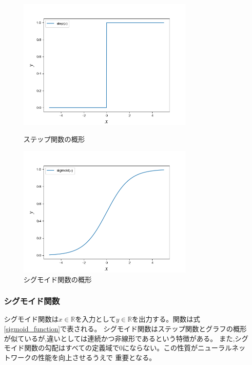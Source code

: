 \begin{figure}[htb]
  \begin{minipage}{0.5\hsize}
  \begin{center}
    \includegraphics[clip, width=88mm]{./figure/step.png}
    \caption{ステップ関数の概形}
  \end{center}
  \end{minipage}
  \begin{minipage}{0.5\hsize}
  \begin{center}
    \includegraphics[clip, width=88mm]{./figure/sigmoid.png}
    \caption{シグモイド関数の概形}
  \end{center}
  \end{minipage}
\end{figure}

\subsubsection{シグモイド関数}
シグモイド関数は$x\in \mathbb{R}$を入力として$y \in \mathbb{R}$を出力する。関数は式\ref{sigmoid_function}で表される。
シグモイド関数はステップ関数とグラフの概形が似ているが,違いとしては連続かつ非線形であるという特徴がある。
また,シグモイド関数の勾配はすべての定義域で0にならない。この性質がニューラルネットワークの性能を向上させるうえで
重要となる。

